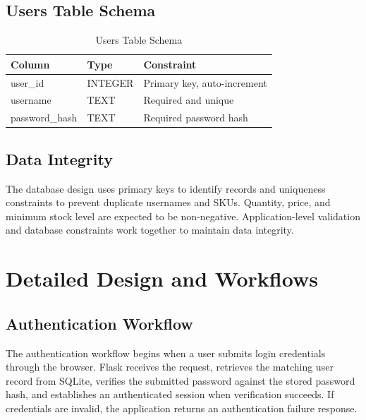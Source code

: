 \documentclass[conference]{IEEEtran}
\begin{document}
\subsection{Users Table Schema}

\begin{table}[!t]
\caption{Users Table Schema}
\label{tab:users}
\centering
\small
\begin{tabularx}{\columnwidth}{l l Y}
\toprule
\textbf{Column} & \textbf{Type} & \textbf{Constraint}\\
\midrule
user\_id & INTEGER & Primary key, auto-increment\\
username & TEXT & Required and unique\\
password\_hash & TEXT & Required password hash\\
\bottomrule
\end{tabularx}
\end{table}

\subsection{Data Integrity}
The database design uses primary keys to identify records and uniqueness constraints to prevent duplicate usernames and SKUs. Quantity, price, and minimum stock level are expected to be non-negative. Application-level validation and database constraints work together to maintain data integrity.

\section{Detailed Design and Workflows}

\subsection{Authentication Workflow}
The authentication workflow begins when a user submits login credentials through the browser. Flask receives the request, retrieves the matching user record from SQLite, verifies the submitted password against the stored password hash, and establishes an authenticated session when verification succeeds. If credentials are invalid, the application returns an authentication failure response.
\end{document}

